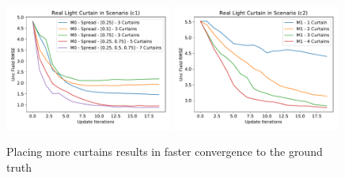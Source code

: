 \begin{figure}[h]
    \centering
    \begin{minipage}{0.5\textwidth}
        \centering
        \includegraphics[width=0.49\textwidth]{figures/Figure_3.pdf}
        \includegraphics[width=0.49\textwidth]{figures/Figure_4.pdf}
    \end{minipage}\hfill
    \centering
    \caption{Placing more curtains results in faster convergence to the ground truth}
    \label{fig:figure34}
\end{figure}


